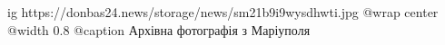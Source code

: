  
 
 
 
 

\ifcmt
  ig https://donbas24.news/storage/news/sm21b9i9wysdhwti.jpg
  @wrap center
  @width 0.8
	@caption Архівна фотографія з Маріуполя
\fi
